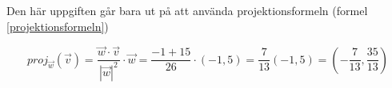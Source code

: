\documentclass[../../main.tex]{subfiles}
\begin{document}
\begin{solution}{21} 

Den här uppgiften går bara ut på att använda projektionsformeln (formel \ref{projektionsformeln})

$$proj_{\vec{w}}(\vec{v}) = \frac{\vec{w}\cdot\vec{v}}{|\vec{w}|^2}\cdot\vec{w} = \frac{-1+15}{26}\cdot (-1, 5) = \frac{7}{13}(-1, 5) = (-\frac{7}{13}, \frac{35}{13})$$

\end{solution}
\end{document}
